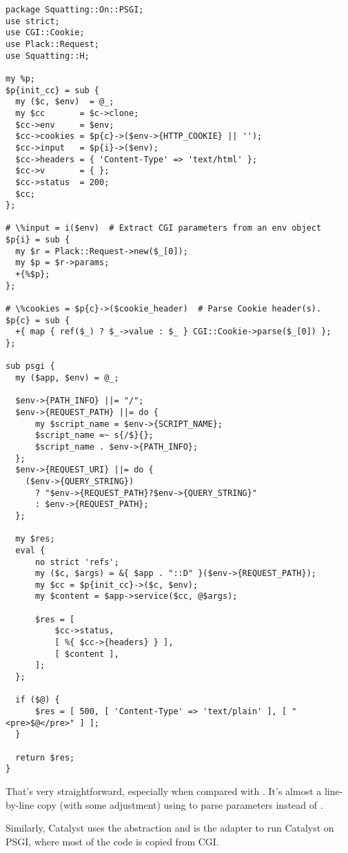 \begin{lstlisting}
package Squatting::On::PSGI;
use strict;
use CGI::Cookie;
use Plack::Request;
use Squatting::H;

my %p;
$p{init_cc} = sub {
  my ($c, $env)  = @_;
  my $cc       = $c->clone;
  $cc->env     = $env;
  $cc->cookies = $p{c}->($env->{HTTP_COOKIE} || '');
  $cc->input   = $p{i}->($env);
  $cc->headers = { 'Content-Type' => 'text/html' };
  $cc->v       = { };
  $cc->status  = 200;
  $cc;
};

# \%input = i($env)  # Extract CGI parameters from an env object
$p{i} = sub {
  my $r = Plack::Request->new($_[0]);
  my $p = $r->params;
  +{%$p};
};

# \%cookies = $p{c}->($cookie_header)  # Parse Cookie header(s).
$p{c} = sub {
  +{ map { ref($_) ? $_->value : $_ } CGI::Cookie->parse($_[0]) };
};

sub psgi {
  my ($app, $env) = @_;

  $env->{PATH_INFO} ||= "/";
  $env->{REQUEST_PATH} ||= do {
      my $script_name = $env->{SCRIPT_NAME};
      $script_name =~ s{/$}{};
      $script_name . $env->{PATH_INFO};
  };
  $env->{REQUEST_URI} ||= do {
    ($env->{QUERY_STRING})
      ? "$env->{REQUEST_PATH}?$env->{QUERY_STRING}"
      : $env->{REQUEST_PATH};
  };

  my $res;
  eval {
      no strict 'refs';
      my ($c, $args) = &{ $app . "::D" }($env->{REQUEST_PATH});
      my $cc = $p{init_cc}->($c, $env);
      my $content = $app->service($cc, @$args);

      $res = [
          $cc->status,
          [ %{ $cc->{headers} } ],
          [ $content ],
      ];
  };

  if ($@) {
      $res = [ 500, [ 'Content-Type' => 'text/plain' ], [ "<pre>$@</pre>" ] ];
  }

  return $res;
}
\end{lstlisting}

That's very straightforward, especially when compared with
\href{http://cpansearch.perl.org/src/BEPPU/Squatting-0.70/lib/Squatting/On/CGI.pm}{}.
It's almost a line-by-line copy (with some adjustment) using
 to parse parameters instead of .

Similarly, Catalyst uses the  abstraction and
\href{http://search.cpan.org/perldoc?Catalyst::Engine::PSGI}{}
is the adapter to run Catalyst on PSGI, where most of the code is copied
from CGI.


